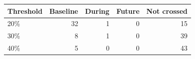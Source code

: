 \begin{tabular}{lrrrr}
\toprule
Threshold & Baseline & During & Future & Not crossed \\
\midrule
20\% & 32 & 1 & 0 & 15 \\
30\% & 8 & 1 & 0 & 39 \\
40\% & 5 & 0 & 0 & 43 \\
\bottomrule
\end{tabular}
